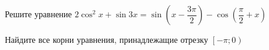 \begin{ex}
	\begin{condition}
		\begin{enumcols}[label=\asbuk*)]
			\item Решите уравнение \( 2\cos^2 x + \sin 3x  = \sin {\left(x -\dfrac{3\pi }{2}\right)} - \cos {\left(\dfrac{\pi }{2}+ x\right)} \)
			\item Найдите все корни уравнения, принадлежащие отрезку \(  \left[-\pi;0\right) \)
		\end{enumcols}
	\end{condition}
\end{ex}